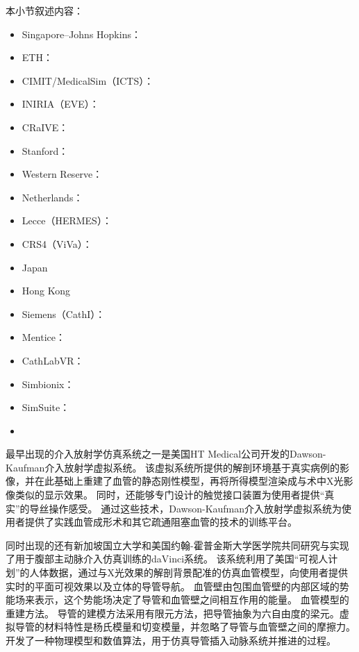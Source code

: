 本小节叙述内容：
\begin{itemize}
  \item Singapore--Johns Hopkins：
  \cite{chui2002simulation}
  \cite{cai2003}\cite{cai2004}\cite{cai2006}
  \cite{Li2007}\cite{Li2006}
  \cite{Wang2007}
  \cite{Chiang2011}
  \item ETH：\cite{Wang2007}
  \item CIMIT/MedicalSim（ICTS）：
  \item INIRIA（EVE）：
  \item CRaIVE：
  \item Stanford：
  \item Western Reserve：
  \item Netherlands：
  \item Lecce（HERMES）：
  \item CRS4（ViVa）：\cite{abdoulaev1998}\cite{Zorcolo2000}\cite{Gobbetti1998}\cite{Gobbetti2000}\cite{Zorcolo1999}
  \item Japan
  \item Hong Kong
  \item Siemens（CathI）：
  \item Mentice：\cite{menticeweb}
  \item CathLabVR：\cite{caeweb}
  \item Simbionix：\cite{simbionixweb}
  \item SimSuite：\cite{simsuiteweb}
  \item \cite{Ilic2005}
\end{itemize}

最早出现的介入放射学仿真系统之一是美国HT Medical公司开发的Dawson-Kaufman介入放射学虚拟系统\cite{Dawson1996DK}\cite{meglan1996DK}。
该虚拟系统所提供的解剖环境基于真实病例的影像\cite{BroNielsen1997DK}，并在此基础上重建了血管的静态刚性模型\cite{Higgins1995DK}\cite{BroNielsen1997DK}，再将所得模型渲染成与术中X光影像类似的显示效果。
同时，还能够专门设计的触觉接口装置为使用者提供“真实”的导丝操作感受\cite{BroNielsen1997DK}。
通过这些技术，Dawson-Kaufman介入放射学虚拟系统为使用者提供了实践血管成形术和其它疏通阻塞血管的技术的训练平台。

同时出现的还有新加坡国立大学和美国约翰-霍普金斯大学医学院共同研究与实现了用于腹部主动脉介入仿真训练的daVinci系统\cite{Anderson1996daVinci}\cite{Anderson1997daVinci}\cite{Anderson1997adaVinci}。
该系统利用了美国“可视人计划”的人体数据，通过与X光效果的解剖背景配准的仿真血管模型，向使用者提供实时的平面可视效果以及立体的导管导航\cite{Anderson1998daVinci}。
血管壁由包围血管壁的内部区域的势能场来表示，这个势能场决定了导管和血管壁之间相互作用的能量\cite{Chui1996daVinci}\cite{Wang1996daVinci}。
血管模型的重建方法\cite{Cai2003Vessel}\cite{Volkau2008Vessel}\cite{Volkau2005Vessel}。
导管的建模方法采用有限元方法，把导管抽象为六自由度的梁元。虚拟导管的材料特性是杨氏模量和切变模量，并忽略了导管与血管壁之间的摩擦力\cite{Anderson1998daVinci}。
开发了一种物理模型和数值算法，用于仿真导管插入动脉系统并推进的过程\cite{Lawton2000daVinci}。

